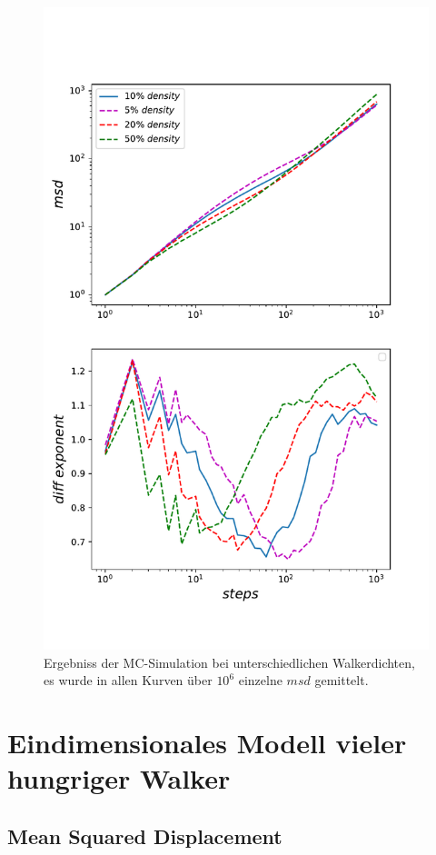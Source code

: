 \documentclass[a4paper, 12pt]{report}
\begin{document}
\begin{figure}[H]
	\centering
	\includegraphics[scale=0.8]{alldens.pdf}
	\caption{Ergebniss der MC-Simulation bei unterschiedlichen Walkerdichten, es wurde in allen Kurven über $10^6$ einzelne $msd$ gemittelt.}
\end{figure}

\newpage
\chapter{Eindimensionales Modell vieler hungriger Walker}

\section{Mean Squared Displacement}
\end{document}
